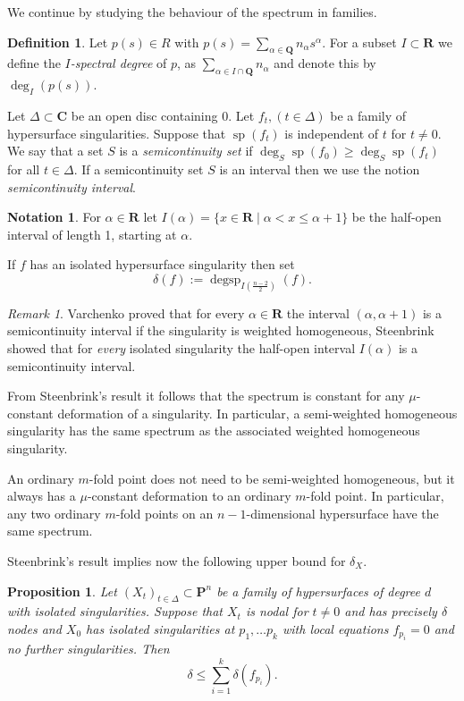 \documentclass{amsart}
\newcommand{\Ps}{\mathbf{P}}
\newcommand{\C}{\mathbf{C}}
\newcommand{\Q}{\mathbf{Q}}
\newcommand{\R}{\mathbf{R}}
\newtheorem{proposition}[lemma]{Proposition}
\theoremstyle{definition}
\newtheorem{notation}[lemma]{Notation}
\newtheorem{definition}[lemma]{Definition}
\theoremstyle{remark}
\newtheorem{remark}[lemma]{Remark}
\DeclareMathOperator{\degsp}{degsp}
\DeclareMathOperator{\spe}{sp}
\begin{document}
We continue by  studying the behaviour of the spectrum in families.  

\begin{definition}
Let $p(s)\in R$ with $p(s) =\sum_{\alpha\in \Q} n_\alpha s^\alpha$. For a subset $I\subset \R$ we define the \emph{$I$-spectral degree} of $p$, as $\sum_{\alpha \in I \cap \Q} n_{\alpha}$ and  denote this by $\deg_I(p(s))$.

Let $\Delta\subset \C$ be an open disc containing $0$.
 Let $f_t, (t\in \Delta)$ be a family of  hypersurface singularities. Suppose that $\spe(f_t)$ is independent of $t$ for $t\neq 0$. We say that a set $S$ is a \emph{semicontinuity set} if $\deg_S \spe(f_0)\geq \deg_S \spe(f_t)$ for all $t\in \Delta$.
 If a semicontinuity  set $S$ is an interval then we use the notion \emph{semicontinuity interval}.
 \end{definition}


\begin{notation}
For $\alpha \in \R$ let  $I(\alpha)=\{x\in \R \mid \alpha <x\leq \alpha+1\}$ be the half-open interval of length 1, starting at $\alpha$.

If $f$ has an isolated hypersurface singularity then set   
\[ \delta(f):= \degsp_{I(\frac{n-2}{2})}(f).\]
\end{notation}
 
 \begin{remark}\label{RmkSemCon}
 Varchenko \cite{VarSC} proved that for every $\alpha\in \R$ the interval $(\alpha,\alpha+1)$ is a semicontinuity interval if the singularity is weighted homogeneous, Steenbrink \cite{SteSC} showed that for \emph{every} isolated singularity the half-open interval $I(\alpha)$ is a semicontinuity interval.
 
 From Steenbrink's result it follows that the spectrum is constant for  any $\mu$-constant deformation of a singularity. In particular, a semi-weighted homogeneous singularity has the same spectrum as the associated weighted homogeneous singularity.
 
 An ordinary $m$-fold point does not need to be semi-weighted homogeneous, but it always has a $\mu$-constant deformation to an ordinary $m$-fold point. In particular, any two ordinary $m$-fold points on an $n-1$-dimensional hypersurface have the same spectrum.
 \end{remark}
 

Steenbrink's result implies now the following upper bound for $\delta_X $.

\begin{proposition}\label{prpSpectral} Let $(X_t)_{t\in \Delta}\subset \Ps^n$ be a family of hypersurfaces of degree $d$ with isolated singularities. Suppose that $X_t$ is nodal for $t\neq 0$ and has precisely $\delta$ nodes  and $X_0$ has  isolated singularities at  $p_1,\dots p_k$ with local equations $f_{p_i}=0$ and no further singularities. Then
\[ \delta \leq \sum_{i=1}^k \delta(f_{p_i}).\]
\end{proposition}
\end{document}
